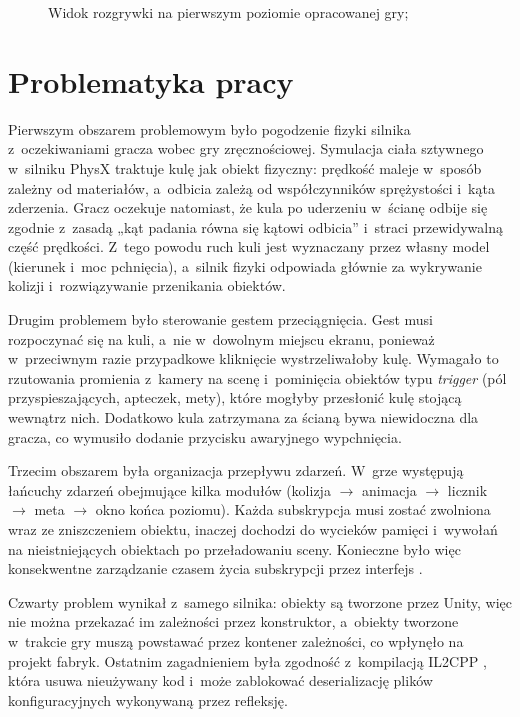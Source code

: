 \begin{figure}[!htb]
  \centering
  \caption{Widok rozgrywki na pierwszym poziomie opracowanej gry; \zrodloWlasne}
  \label{rys:hud-wstep}
\end{figure}

\section{Problematyka pracy}

Pierwszym obszarem problemowym było pogodzenie fizyki silnika z~oczekiwaniami gracza
wobec gry zręcznościowej. Symulacja ciała sztywnego w~silniku PhysX traktuje kulę jak
obiekt fizyczny: prędkość maleje w~sposób zależny od materiałów, a~odbicia zależą od
współczynników sprężystości i~kąta zderzenia. Gracz oczekuje natomiast, że kula po
uderzeniu w~ścianę odbije się zgodnie z~zasadą „kąt padania równa się kątowi odbicia”
i~straci przewidywalną część prędkości. Z~tego powodu ruch kuli jest wyznaczany przez
własny model (kierunek i~moc pchnięcia), a~silnik fizyki odpowiada głównie za wykrywanie
kolizji i~rozwiązywanie przenikania obiektów.

Drugim problemem było sterowanie gestem przeciągnięcia. Gest musi rozpoczynać się na kuli,
a~nie w~dowolnym miejscu ekranu, ponieważ w~przeciwnym razie przypadkowe kliknięcie
wystrzeliwałoby kulę. Wymagało to rzutowania promienia z~kamery na scenę i~pominięcia
obiektów typu \emph{trigger} (pól przyspieszających, apteczek, mety), które mogłyby
przesłonić kulę stojącą wewnątrz nich. Dodatkowo kula zatrzymana za ścianą bywa
niewidoczna dla gracza, co wymusiło dodanie przycisku awaryjnego wypchnięcia.

Trzecim obszarem była organizacja przepływu zdarzeń. W~grze występują łańcuchy zdarzeń
obejmujące kilka modułów (kolizja $\rightarrow$ animacja $\rightarrow$ licznik $\rightarrow$
meta $\rightarrow$ okno końca poziomu). Każda subskrypcja musi zostać zwolniona wraz ze
zniszczeniem obiektu, inaczej dochodzi do wycieków pamięci i~wywołań na nieistniejących
obiektach po przeładowaniu sceny. Konieczne było więc konsekwentne zarządzanie czasem
życia subskrypcji przez interfejs .

Czwarty problem wynikał z~samego silnika: obiekty  są tworzone przez
Unity, więc nie można przekazać im zależności przez konstruktor, a~obiekty tworzone
w~trakcie gry muszą powstawać przez kontener zależności, co wpłynęło na projekt fabryk.
Ostatnim zagadnieniem była zgodność z~kompilacją IL2CPP \cite{unity-il2cpp}, która
usuwa nieużywany kod i~może zablokować deserializację plików konfiguracyjnych wykonywaną
przez refleksję.


